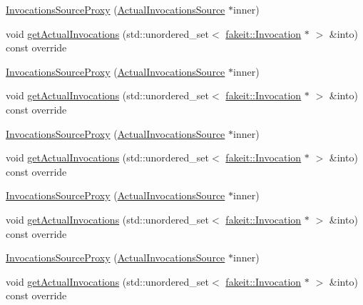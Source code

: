 \begin{DoxyCompactItemize}
\mbox{\hyperlink{structfakeit_1_1InvocationsSourceProxy_a2628cc72ce5694e87d7b1208dd3c6518}{Invocations\+Source\+Proxy}} (\mbox{\hyperlink{structfakeit_1_1ActualInvocationsSource}{Actual\+Invocations\+Source}} $\ast$inner)
\item 
void \mbox{\hyperlink{structfakeit_1_1InvocationsSourceProxy_af06b5d62b0c4ff1e3048fae5d7ddd8c3}{get\+Actual\+Invocations}} (std\+::unordered\+\_\+set$<$ \mbox{\hyperlink{structfakeit_1_1Invocation}{fakeit\+::\+Invocation}} $\ast$ $>$ \&into) const override
\item 
\mbox{\hyperlink{structfakeit_1_1InvocationsSourceProxy_a2628cc72ce5694e87d7b1208dd3c6518}{Invocations\+Source\+Proxy}} (\mbox{\hyperlink{structfakeit_1_1ActualInvocationsSource}{Actual\+Invocations\+Source}} $\ast$inner)
\item 
void \mbox{\hyperlink{structfakeit_1_1InvocationsSourceProxy_af06b5d62b0c4ff1e3048fae5d7ddd8c3}{get\+Actual\+Invocations}} (std\+::unordered\+\_\+set$<$ \mbox{\hyperlink{structfakeit_1_1Invocation}{fakeit\+::\+Invocation}} $\ast$ $>$ \&into) const override
\item 
\mbox{\hyperlink{structfakeit_1_1InvocationsSourceProxy_a2628cc72ce5694e87d7b1208dd3c6518}{Invocations\+Source\+Proxy}} (\mbox{\hyperlink{structfakeit_1_1ActualInvocationsSource}{Actual\+Invocations\+Source}} $\ast$inner)
\item 
void \mbox{\hyperlink{structfakeit_1_1InvocationsSourceProxy_af06b5d62b0c4ff1e3048fae5d7ddd8c3}{get\+Actual\+Invocations}} (std\+::unordered\+\_\+set$<$ \mbox{\hyperlink{structfakeit_1_1Invocation}{fakeit\+::\+Invocation}} $\ast$ $>$ \&into) const override
\item 
\mbox{\hyperlink{structfakeit_1_1InvocationsSourceProxy_a2628cc72ce5694e87d7b1208dd3c6518}{Invocations\+Source\+Proxy}} (\mbox{\hyperlink{structfakeit_1_1ActualInvocationsSource}{Actual\+Invocations\+Source}} $\ast$inner)
\item 
void \mbox{\hyperlink{structfakeit_1_1InvocationsSourceProxy_af06b5d62b0c4ff1e3048fae5d7ddd8c3}{get\+Actual\+Invocations}} (std\+::unordered\+\_\+set$<$ \mbox{\hyperlink{structfakeit_1_1Invocation}{fakeit\+::\+Invocation}} $\ast$ $>$ \&into) const override
\item 
\mbox{\hyperlink{structfakeit_1_1InvocationsSourceProxy_a2628cc72ce5694e87d7b1208dd3c6518}{Invocations\+Source\+Proxy}} (\mbox{\hyperlink{structfakeit_1_1ActualInvocationsSource}{Actual\+Invocations\+Source}} $\ast$inner)
\item 
void \mbox{\hyperlink{structfakeit_1_1InvocationsSourceProxy_af06b5d62b0c4ff1e3048fae5d7ddd8c3}{get\+Actual\+Invocations}} (std\+::unordered\+\_\+set$<$ \mbox{\hyperlink{structfakeit_1_1Invocation}{fakeit\+::\+Invocation}} $\ast$ $>$ \&into) const override
\end{DoxyCompactItemize}



